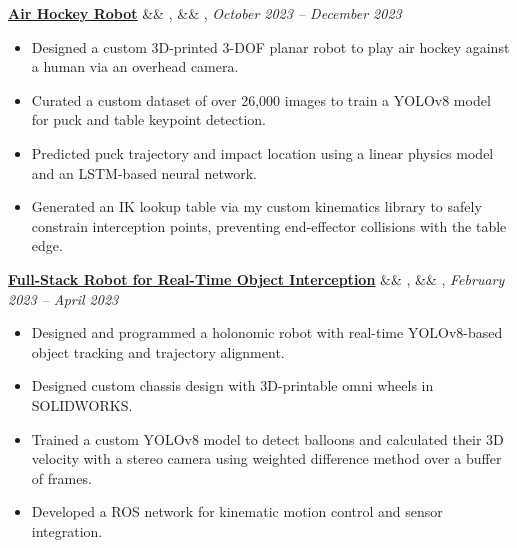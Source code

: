 \documentclass[letterpaper,10pt]{article}
\newcommand{\experience}[5]{%
    \noindent\textbf{#1}%
    \ifx&#2&
    \else
        , \textit{#2}%
    \fi
    \ifx&#3&
    \else
        , #3%
    \fi
    \hfill \textit{#4} \\
    \vspace{-6.8mm}%
    \begin{itemize}[itemsep=-5pt]
        \setlength{\itemindent}{0em}
        #5
    \end{itemize}
    \vspace{1mm}
}
\begin{document}
    
\experience
    {\href{https://ryanbarry.me/projects/robotics/air-hockey-robot/}{Air Hockey Robot}}
    {}
    {}
    {October 2023 – December 2023}
    {
        \item Designed a custom 3D-printed 3-DOF planar robot to play air hockey against a human via an overhead camera.
        \item Curated a custom dataset of over 26,000 images to train a YOLOv8 model for puck and table keypoint detection.
        \item Predicted puck trajectory and impact location using a linear physics model and an LSTM-based neural network.
        \item Generated an IK lookup table via my custom kinematics library to safely constrain interception points, preventing end-effector collisions with the table edge.
    }


    
\experience
    {\href{https://ryanbarry.me/projects/robotics/omnidirectional-robot/}{Full-Stack Robot for Real-Time Object Interception}}
    {}
    {}
    {February 2023 – April 2023}
    {

        \item Designed and programmed a holonomic robot with real-time YOLOv8-based object tracking and trajectory alignment.
        \item Designed custom chassis design with 3D-printable omni wheels in SOLIDWORKS.
        \item Trained a custom YOLOv8 model to detect balloons and calculated their 3D velocity with a stereo camera using weighted difference method over a buffer of frames.
        \item Developed a ROS network for kinematic motion control and sensor integration.
    }
    
\end{document}
